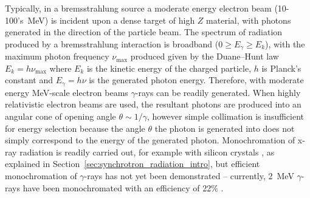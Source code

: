 \documentclass[../main.tex]{subfiles}
\begin{document}
Typically, in a bremsstrahlung source a moderate energy electron beam (10-100's~\si{\mega\electronvolt}) is incident upon a dense target of high $Z$ material, with photons generated in the direction of the particle beam. The spectrum of radiation produced by a bremsstrahlung interaction is broadband ($0 \geq E_{\gamma} \geq E_{k}$), with the maximum photon frequency $\nu_{\mathrm{max}}$ produced given by the Duane--Hunt law \cite{duane1915proceedings} $E_{k}=h\nu_{\mathrm{max}}$ where $E_{k}$ is the kinetic energy of the charged particle, $h$ is Planck's constant and $E_{\gamma}=h\nu$ is the generated photon energy. Therefore, with moderate energy \si{\mega\electronvolt}-scale electron beams $\gamma$-rays can be readily generated. When highly relativistic electron beams are used, the resultant photons are produced into an angular cone of opening angle $\theta\sim 1/\gamma$, however simple collimation is insufficient for energy selection because the angle $\theta$ the photon is generated into does not simply correspond to the energy of the generated photon. Monochromation of x-ray radiation is readily carried out, for example with silicon crystals , as explained in Section~\ref{sec:synchrotron_radiation_intro}, but efficient monochromation of $\gamma$-rays has not yet been demonstrated -- currently, 2~\si{\mega\electronvolt} $\gamma$-rays have been monochromated with an efficiency of 22\% \cite{jentschel2012gamma}. 
\end{document}
